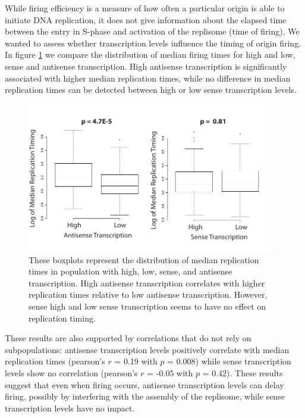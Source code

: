 While firing efficiency is a measure of how often a particular origin is able to initiate DNA replication, it does not give information about the elapsed time between the entry in S-phase and activation of the replisome (time of firing). 
We wanted to assess whether transcription levels influence the timing of origin firing. 
In figure \ref{fig:timing} we compare the distribution of median firing times for high and low, sense and antisense transcription. 
High antisense transcription is significantly associated with higher median replication times, while no difference in median replication times can be detected between high or low sense transcription levels. 
\begin{figure}[h!]

\centering
\includegraphics[width=0.97\textwidth]{figures/results/timing}
\caption[boxplots comparing median replication times in high- and low-transcription populations]{These boxplots represent the distribution of median replication times in population with high, low, sense, and antisense transcription. High antisense transcription correlates with higher replication times relative to low antisense transcription. However, sense high and low sense transcription seems to have no effect on replication timing.}
\label{fig:timing}

\end{figure} 
These results are also supported by correlations that do not rely on subpopulations: antisense transcription levels positively correlate with median replication times (pearson’s $r$ = 0.19 with $p$ = 0.008) while sense transcription levels show no correlation (pearson’s $r$ = -0.05 with $p$ = 0.42). These results suggest that even when firing occurs, antisense transcription levels can delay firing, possibly by interfering with the assembly of the replisome, while sense transcription levels have no impact.

